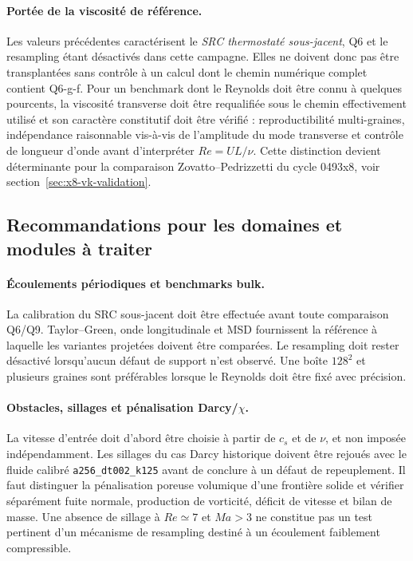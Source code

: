 \documentclass[11pt,a4paper]{article}
\begin{document}
\paragraph{Portée de la viscosité de référence.}
Les valeurs précédentes caractérisent le \emph{SRC thermostaté sous-jacent}, Q6 et le resampling étant désactivés dans cette campagne. Elles ne doivent donc pas être transplantées sans contrôle à un calcul dont le chemin numérique complet contient Q6-g-f. Pour un benchmark dont le Reynolds doit être connu à quelques pourcents, la viscosité transverse doit être requalifiée sous le chemin effectivement utilisé et son caractère constitutif doit être vérifié : reproductibilité multi-graines, indépendance raisonnable vis-à-vis de l'amplitude du mode transverse et contrôle de longueur d'onde avant d'interpréter $Re=UL/\nu$. Cette distinction devient déterminante pour la comparaison Zovatto--Pedrizzetti du cycle 0493x8, voir section~\ref{sec:x8-vk-validation}.

\subsection{Recommandations pour les domaines et modules à traiter}

\paragraph{Écoulements périodiques et benchmarks bulk.}
La calibration du SRC sous-jacent doit être effectuée avant toute comparaison Q6/Q9. Taylor--Green, onde longitudinale et MSD fournissent la référence à laquelle les variantes projetées doivent être comparées. Le resampling doit rester désactivé lorsqu'aucun défaut de support n'est observé. Une boîte $128^2$ et plusieurs graines sont préférables lorsque le Reynolds doit être fixé avec précision.

\paragraph{Obstacles, sillages et pénalisation Darcy/$\chi$.}
La vitesse d'entrée doit d'abord être choisie à partir de $c_s$ et de $\nu$, et non imposée indépendamment. Les sillages du cas Darcy historique doivent être rejoués avec le fluide calibré \texttt{a256\_dt002\_k125} avant de conclure à un défaut de repeuplement. Il faut distinguer la pénalisation poreuse volumique d'une frontière solide et vérifier séparément fuite normale, production de vorticité, déficit de vitesse et bilan de masse. Une absence de sillage à $Re\simeq7$ et $Ma>3$ ne constitue pas un test pertinent d'un mécanisme de resampling destiné à un écoulement faiblement compressible.
\end{document}
